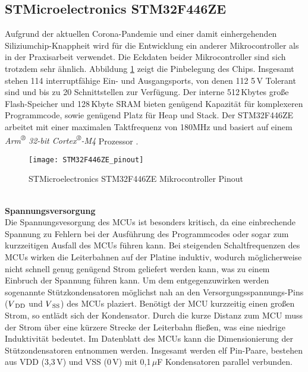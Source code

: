
\subsection{STMicroelectronics STM32F446ZE}
Aufgrund der aktuellen Corona-Pandemie und einer damit einhergehenden Siliziumchip-Knappheit wird für die Entwicklung ein anderer Mikrocontroller als in der Praxisarbeit verwendet. Die Eckdaten beider Mikrocontroller sind sich trotzdem sehr ähnlich. Abbildung \ref{fig:MCU_pinout} zeigt die Pinbelegung des Chips. Insgesamt stehen 114 interruptfähige Ein- und Ausgangsports, von denen 112 5\,V Tolerant sind und bis zu 20 Schnittstellen zur Verfügung. Der interne 512\,Kbytes große Flash-Speicher und 128\,Kbyte SRAM bieten genügend Kapazität für komplexeren Programmcode, sowie genügend Platz für Heap und Stack. Der STM32F446ZE arbeitet mit einer maximalen Taktfrequenz von 180MHz und basiert auf einem \textit{Arm\textsuperscript{®} 32-bit Cortex\textsuperscript{®}-M4} Prozessor \cite[s. 1]{STM32F446ZE_Datasheet}.
\begin{figure}[!h]
	\begin{center}
		\texttt{[image: STM32F446ZE\_pinout]}
		\caption{STMicroelectronics STM32F446ZE Mikrocontroller Pinout \cite[S. 41]{STM32F446ZE_Datasheet}}
		\label{fig:MCU_pinout}
	\end{center}
\end{figure}\\
\hspace{-5mm}\textbf{Spannungsversorgung}\\
Die Spannungsvesorgung des MCUs ist besonders kritisch, da eine einbrechende Spannung zu Fehlern bei der Ausführung des Programmcodes oder sogar zum kurzzeitigen Ausfall des MCUs führen kann. Bei steigenden Schaltfrequenzen des MCUs wirken die Leiterbahnen auf der Platine induktiv, wodurch möglicherweise nicht schnell genug genügend Strom geliefert werden kann, was zu einem Einbruch der Spannung führen kann. Um dem entgegenzuwirken werden sogenannte Stützkondensatoren möglichst nah an den Versorgungsspannungs-Pins ($V\textsubscript{DD}$ und $V\textsubscript{SS}$) des MCUs plaziert. Benötigt der MCU kurzzeitig einen großen Strom, so entlädt sich der Kondensator. Durch die kurze Distanz zum MCU muss der Strom über eine kürzere Strecke der Leiterbahn fließen, was eine niedrige Induktivität bedeutet. Im Datenblatt \cite{F446RM} des MCUs kann die Dimensionierung der Stützondensatoren entnommen werden. Insgesamt werden elf Pin-Paare, bestehen aus VDD (3,3\,V) und VSS (0\,V) mit 0,1\,$\mu$F Kondensatoren parallel verbunden.\\
